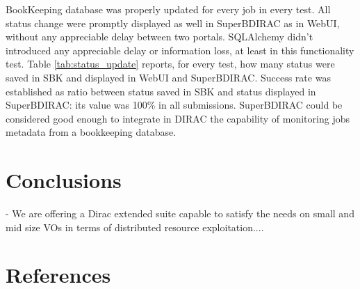 \documentclass[a4paper]{jpconf}
\begin{document}
BookKeeping database was properly updated for every job in every test. All status change were promptly displayed as well in SuperBDIRAC as in WebUI, without any appreciable delay between two portals. SQLAlchemy didn't introduced any appreciable delay or information loss, at least in this functionality test. 
Table \ref{tab:status_update} reports, for every test, how many status were saved in SBK and displayed in WebUI and SuperBDIRAC. Success rate was established as ratio between status saved in SBK and status displayed in SuperBDIRAC: its value was 100\% in all submissions.
SuperBDIRAC could be considered good enough to integrate in DIRAC the capability of monitoring jobs metadata from a bookkeeping database.

\section{Conclusions}

- We are offering a Dirac extended suite capable to satisfy the
needs on small and mid size VOs in terms of distributed
resource exploitation....



\section*{References}
\end{document}
